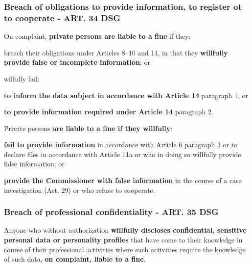 \subsubsection{Breach of obligations to provide information, to register ot to cooperate - ART. 34 DSG}
\begin{compactenum}	
	\item On complaint,\textbf{ private persons are liable to a fine} if they:
	\begin{compactenum}	
		\item breach their obligations under Articles 8–10 and 14, in that they \textbf{willfully provide false or incomplete information}; or
		\item wilfully fail:
		\begin{compactenum}	
			\item \textbf{to inform the data subject in accordance with Article 14} paragraph 1, or
			\item \textbf{to provide information required under Article 14} paragraph 2.
		\end{compactenum}
	\end{compactenum}
	\item Private persons \textbf{are liable to a fine if they willfully}:
	\begin{compactenum}	
		\item \textbf{fail to provide information} in accordance with Article 6 paragraph 3 or to declare files in accordance with Article 11a or who in doing so willfully provide false information; or
		\item \textbf{provide the Commissioner with false information} in the course of a case investigation (Art. 29) or who refuse to cooperate.
	\end{compactenum}
\end{compactenum}

\subsubsection{Breach of professional confidentiality - ART. 35 DSG}
\begin{compactenum}	
	\item Anyone who without authorization \textbf{willfully discloses confidential, sensitive personal data or personality profiles} that have come to their knowledge in course of their professional activities where such activities require the knowledge of such data, \textbf{on complaint, liable to a fine}.
\end{compactenum}

